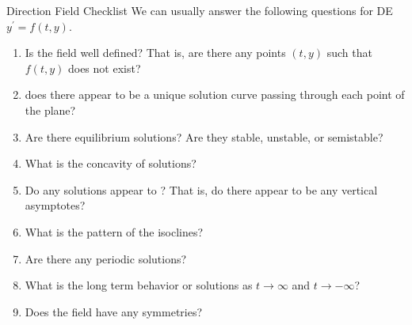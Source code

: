\documentclass{beamer}
\begin{document}
\begin{frame}
\begin{block}{Direction Field Checklist}
We can usually answer the following questions for DE $y^\prime=f(t,y)$.
\begin{enumerate}[<+- | alert@+>]
\item Is the field well defined? That is, are there any points $(t,y)$ such that $f(t,y)$ does not exist?
\item does there appear to be a unique solution curve passing through each point of the plane?
\item Are there equilibrium solutions? Are they stable, unstable, or semistable?
\item What is the concavity of solutions?
\item Do any solutions appear to ? That is, do there appear to be any vertical asymptotes?
\item What is the pattern of the isoclines?
\item Are there any periodic solutions?
\item What is the long term behavior or solutions as $t\rightarrow\infty$ and $t\rightarrow-\infty$?
\item Does the field have any symmetries?
\end{enumerate}
\end{block}
\end{frame}
\end{document}
